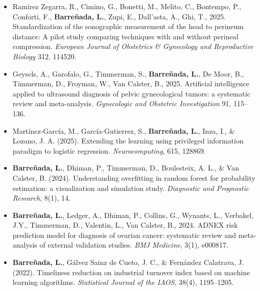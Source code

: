 \begin{itemize}
    \item Ramirez Zegarra, R., Cimino, G., Bonetti, M., Melito, C., Bontempo, P., Conforti, F., \textbf{Barreñada, L.}, Zupi, E., Dall’asta, A., Ghi, T., 2025. Standardization of the sonographic measurement of the head to perineum distance: A pilot study comparing techniques with and without perineal compression. \textit{European Journal of Obstetrics \& Gynecology and Reproductive Biology} 312, 114520.
    \item Geysels, A., Garofalo, G., Timmerman, S., \textbf{Barreñada, L.}, De Moor, B., Timmerman, D., Froyman, W., Van Calster, B., 2025. Artificial intelligence applied to ultrasound diagnosis of pelvic gynecological tumors: a systematic review and meta-analysis. \textit{Gynecologic and Obstetric Investigation} 91, 115–136.

    \item Martínez-García, M., García-Gutierrez, S., \textbf{Barreñada, L.}, Inza, I., \& Lozano, J. A. (2025). 
    Extending the learning using privileged information paradigm to logistic regression. 
    \textit{Neurocomputing}, 615, 128869.

    \item [$\blacksquare$] \textbf{Barreñada, L.}, Dhiman, P., Timmerman, D., Boulesteix, A. L., \& Van Calster, B. (2024). 
    Understanding overfitting in random forest for probability estimation: a visualization and simulation study. 
    \textit{Diagnostic and Prognostic Research}, 8(1), 14.

    \item [$\blacksquare$]  \textbf{Barreñada, L.}, Ledger, A., Dhiman, P., Collins, G., Wynants, L., Verbakel, J.Y., Timmerman, D., Valentin, L., Van Calster, B., 2024. ADNEX risk prediction model for diagnosis of ovarian cancer: systematic review and meta-analysis of external validation studies. \textit{BMJ Medicine}, 3(1), e000817.


    \item \textbf{Barreñada, L.}, Gálvez Sainz de Cueto, J. C., \& Fernández Calatrava, J. (2022). 
    Timeliness reduction on industrial turnover index based on machine learning algorithms. 
    \textit{Statistical Journal of the IAOS}, 38(4), 1195--1205.
\end{itemize}

\clearpage

\newpage 
\pagestyle{empty} 
\null 
